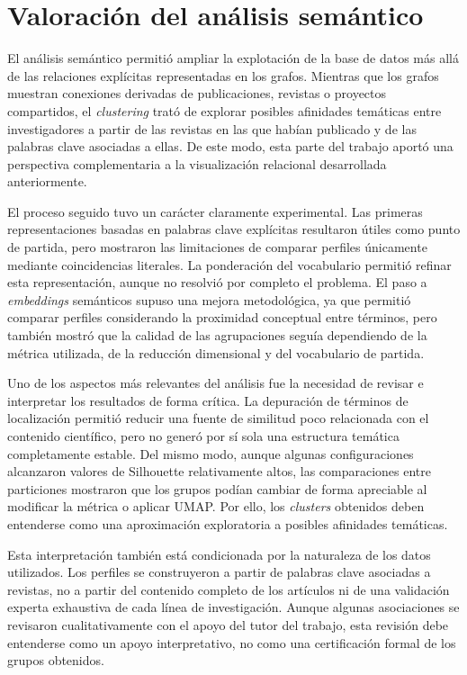 \documentclass[11pt,spanish,listoffigures,listoftables]{tfgetsinf}
\begin{document}
\section{Valoración del análisis semántico}

El análisis semántico permitió ampliar la explotación de la base de datos más allá de las relaciones explícitas representadas en los grafos. Mientras que los grafos muestran conexiones derivadas de publicaciones, revistas o proyectos compartidos, el \textit{clustering} trató de explorar posibles afinidades temáticas entre investigadores a partir de las revistas en las que habían publicado y de las palabras clave asociadas a ellas. De este modo, esta parte del trabajo aportó una perspectiva complementaria a la visualización relacional desarrollada anteriormente.

El proceso seguido tuvo un carácter claramente experimental. Las primeras representaciones basadas en palabras clave explícitas resultaron útiles como punto de partida, pero mostraron las limitaciones de comparar perfiles únicamente mediante coincidencias literales. La ponderación del vocabulario permitió refinar esta representación, aunque no resolvió por completo el problema. El paso a \textit{embeddings} semánticos supuso una mejora metodológica, ya que permitió comparar perfiles considerando la proximidad conceptual entre términos, pero también mostró que la calidad de las agrupaciones seguía dependiendo de la métrica utilizada, de la reducción dimensional y del vocabulario de partida.

Uno de los aspectos más relevantes del análisis fue la necesidad de revisar e interpretar los resultados de forma crítica. La depuración de términos de localización permitió reducir una fuente de similitud poco relacionada con el contenido científico, pero no generó por sí sola una estructura temática completamente estable. Del mismo modo, aunque algunas configuraciones alcanzaron valores de Silhouette relativamente altos, las comparaciones entre particiones mostraron que los grupos podían cambiar de forma apreciable al modificar la métrica o aplicar UMAP. Por ello, los \textit{clusters} obtenidos deben entenderse como una aproximación exploratoria a posibles afinidades temáticas.

Esta interpretación también está condicionada por la naturaleza de los datos utilizados. Los perfiles se construyeron a partir de palabras clave asociadas a revistas, no a partir del contenido completo de los artículos ni de una validación experta exhaustiva de cada línea de investigación. Aunque algunas asociaciones se revisaron cualitativamente con el apoyo del tutor del trabajo, esta revisión debe entenderse como un apoyo interpretativo, no como una certificación formal de los grupos obtenidos.
\end{document}
